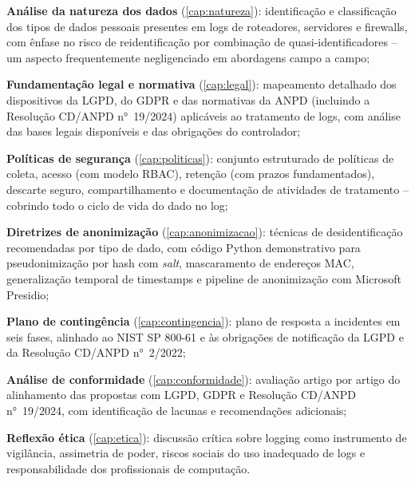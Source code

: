 \begin{alineas}
    \item \textbf{Análise da natureza dos dados} (\autoref{cap:natureza}): identificação e classificação dos tipos de dados pessoais presentes em logs de roteadores, servidores e firewalls, com ênfase no risco de reidentificação por combinação de quasi-identificadores -- um aspecto frequentemente negligenciado em abordagens campo a campo;

    \item \textbf{Fundamentação legal e normativa} (\autoref{cap:legal}): mapeamento detalhado dos dispositivos da LGPD, do GDPR e das normativas da ANPD (incluindo a Resolução CD/ANPD n°~19/2024) aplicáveis ao tratamento de logs, com análise das bases legais disponíveis e das obrigações do controlador;

    \item \textbf{Políticas de segurança} (\autoref{cap:politicas}): conjunto estruturado de políticas de coleta, acesso (com modelo RBAC), retenção (com prazos fundamentados), descarte seguro, compartilhamento e documentação de atividades de tratamento -- cobrindo todo o ciclo de vida do dado no log;

    \item \textbf{Diretrizes de anonimização} (\autoref{cap:anonimizacao}): técnicas de desidentificação recomendadas por tipo de dado, com código Python demonstrativo para pseudonimização por hash com \textit{salt}, mascaramento de endereços MAC, generalização temporal de timestamps e pipeline de anonimização com Microsoft Presidio;

    \item \textbf{Plano de contingência} (\autoref{cap:contingencia}): plano de resposta a incidentes em seis fases, alinhado ao NIST SP 800-61 e às obrigações de notificação da LGPD e da Resolução CD/ANPD n°~2/2022;

    \item \textbf{Análise de conformidade} (\autoref{cap:conformidade}): avaliação artigo por artigo do alinhamento das propostas com LGPD, GDPR e Resolução CD/ANPD n°~19/2024, com identificação de lacunas e recomendações adicionais;

    \item \textbf{Reflexão ética} (\autoref{cap:etica}): discussão crítica sobre logging como instrumento de vigilância, assimetria de poder, riscos sociais do uso inadequado de logs e responsabilidade dos profissionais de computação.
\end{alineas}


